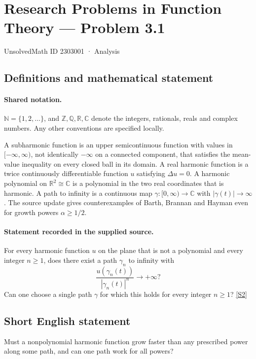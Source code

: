 \documentclass[11pt]{article}
\newcommand{\sref}[2]{\hyperlink{source:#1:#2}{[S#2]}}
\begin{document}
\setcounter{section}{2303000}
\section{Research Problems in Function Theory — Problem 3.1}\label{2303001}
{\small\sffamily UnsolvedMath ID 2303001 · Analysis}
\subsection{Definitions and mathematical statement}

\paragraph{Shared notation.}$\mathbb N=\{1,2,\ldots\}$, and $\mathbb Z,\mathbb Q,\mathbb R,\mathbb C$ denote the integers, rationals, reals and complex numbers. Any other conventions are specified locally.


A subharmonic function is an upper semicontinuous function with values in $[-\infty,\infty)$, not identically $-\infty$ on a connected component, that satisfies the mean-value inequality on every closed ball in its domain. A real harmonic function is a twice continuously differentiable function $u$ satisfying $\Delta u=0$. A harmonic polynomial on $\mathbb R^2\cong\mathbb C$ is a polynomial in the two real coordinates that is harmonic. A path to infinity is a continuous map $\gamma:[0,\infty)\to\mathbb C$ with $|\gamma(t)|\to\infty$.
The source update gives counterexamples of Barth, Brannan and Hayman even for growth powers $\alpha\geq1/2$.
\paragraph{Statement recorded in the supplied source.}
For every harmonic function $u$ on the plane that is not a polynomial and every integer $n\geq1$, does there exist a path $\gamma_n$ to infinity with
\[\frac{u(\gamma_n(t))}{|\gamma_n(t)|^n}\longrightarrow+\infty?\]
Can one choose a single path $\gamma$ for which this holds for every integer $n\geq1$? \sref{2303001}{2}
\subsection{Short English statement}
Must a nonpolynomial harmonic function grow faster than any prescribed power along some path, and can one path work for all powers?
\end{document}
